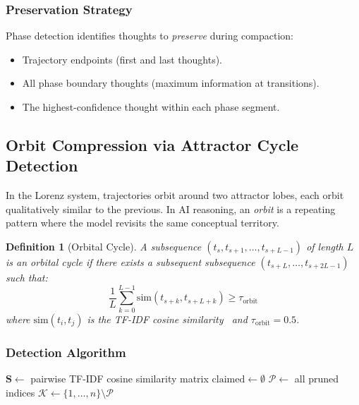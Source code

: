 \documentclass[journal,10pt]{IEEEtran}
\newtheorem{definition}{Definition}
\begin{document}
\subsubsection{Preservation Strategy}

Phase detection identifies thoughts to \emph{preserve} during compaction:
\begin{itemize}[nosep]
\item Trajectory endpoints (first and last thoughts).
\item All phase boundary thoughts (maximum information at transitions).
\item The highest-confidence thought within each phase segment.
\end{itemize}

\subsection{Orbit Compression via Attractor Cycle Detection}
\label{sec:orbit}

In the Lorenz system, trajectories orbit around two attractor lobes, each orbit qualitatively similar to the previous. In AI reasoning, an \emph{orbit} is a repeating pattern where the model revisits the same conceptual territory.

\begin{definition}[Orbital Cycle]
\label{def:orbit}
A subsequence $(t_{s}, t_{s+1}, \ldots, t_{s+L-1})$ of length $L$ is an \emph{orbital cycle} if there exists a subsequent subsequence $(t_{s+L}, \ldots, t_{s+2L-1})$ such that:
\begin{equation}
\frac{1}{L} \sum_{k=0}^{L-1} \mathrm{sim}(t_{s+k}, t_{s+L+k}) \geq \tau_{\mathrm{orbit}}
\label{eq:orbit}
\end{equation}
where $\mathrm{sim}(t_i, t_j)$ is the TF-IDF cosine similarity~\cite{salton1988} and $\tau_{\mathrm{orbit}} = 0.5$.
\end{definition}

\subsubsection{Detection Algorithm}

\begin{algorithm}[!t]
\caption{Orbit Compression}\label{alg:orbit}
\SetAlgoLined
{}
$\mathbf{S} \leftarrow$ pairwise TF-IDF cosine similarity matrix\;
$\mathrm{claimed} \leftarrow \emptyset$\;
\For{$L \leftarrow \min(L_{\max}, \lfloor n/2 \rfloor)$ \KwTo $L_{\min}$}{
  \For{$s \leftarrow 0$ \KwTo $n - L \cdot R_{\min}$}{
    \If{$\exists k \in [s, s+L): k \in \mathrm{claimed}$}{\textbf{continue}}
    $(r, \bar{S}) \leftarrow \mathrm{detectRepetitions}(\mathbf{S}, s, L, \tau)$\;
    \If{$r \geq R_{\min}$}{
      $\mathrm{claimed} \leftarrow \mathrm{claimed} \cup \{s, \ldots, s + r \cdot L - 1\}$\;
      Keep first cycle $[s, s+L)$, prune copies\;
    }
  }
}
$\mathcal{P} \leftarrow$ all pruned indices\;
$\mathcal{K} \leftarrow \{1, \ldots, n\} \setminus \mathcal{P}$\;
\end{algorithm}
\end{document}
